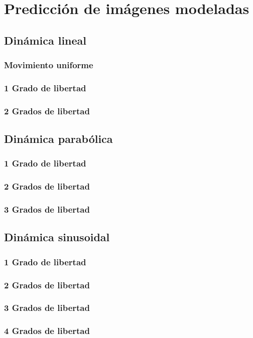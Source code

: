 \chapter{Predicción de imágenes modeladas}\label{cap.redes3dmod}

\section{Dinámica lineal}
\subsection{Movimiento uniforme}
\subsection{1 Grado de libertad}
\subsection{2 Grados de libertad}

\section{Dinámica parabólica}
\subsection{1 Grado de libertad}
\subsection{2 Grados de libertad}
\subsection{3 Grados de libertad}

\section{Dinámica sinusoidal}
\subsection{1 Grado de libertad}
\subsection{2 Grados de libertad}
\subsection{3 Grados de libertad}
\subsection{4 Grados de libertad}